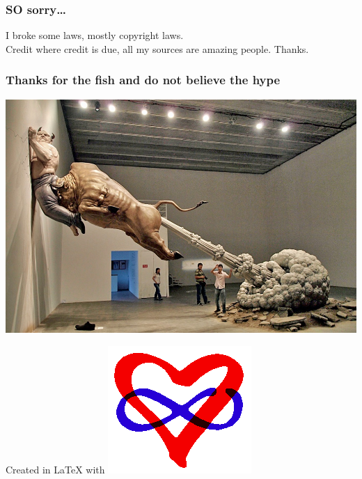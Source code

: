 \documentclass[a4paper]{beamer}
\begin{document}
\begin{frame}
\frametitle{SO sorry\ldots}
I broke some laws, mostly copyright laws.
\\
Credit where credit is due, all my sources are amazing people. Thanks.
\end{frame}

\begin{frame}
\frametitle{Thanks for the fish and do not believe the hype}
\begin{center}
\includegraphics[scale=1.00]{img/bullshit-sculpture.jpg}
\end{center}
Created in \LaTeX{} with \includegraphics[scale=0.05]{img/polyamory.png}
\end{frame}
\end{document}
